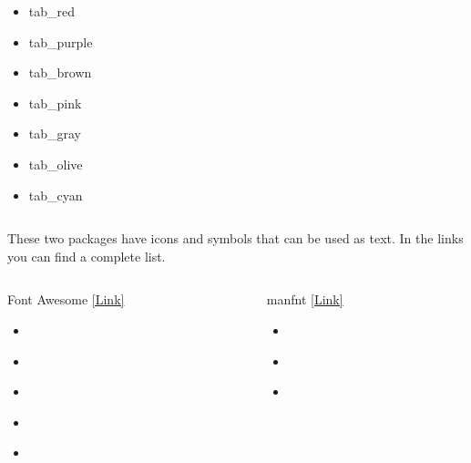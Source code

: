 \documentclass[aspectratio=1610,11pt]{beamer}
\begin{document}
\begin{frame}{\insertsection}
\begin{columns}[t]
\begin{column}{0.33\textwidth}
\begin{itemize}
            \item \textcolor{tab_red}{tab\_red}
            \item \textcolor{tab_purple}{tab\_purple}
            \item \textcolor{tab_brown}{tab\_brown}
            \item \textcolor{tab_pink}{tab\_pink}
            \item \textcolor{tab_gray}{tab\_gray}
            \item \textcolor{tab_olive}{tab\_olive}
            \item \textcolor{tab_cyan}{tab\_cyan}
            \end{itemize}
        \end{column}
    \end{columns}
\end{frame}





\begin{frame}{\insertsection}
These two packages have icons and symbols that can be used as text. In the links you can find a complete list.
\begin{columns}[t]
    \begin{column}{0.5\textwidth}
       Font Awesome \href{https://mirrors.ibiblio.org/CTAN/fonts/fontawesome/doc/fontawesome.pdf}{[Link]}
       \begin{itemize}
           \item \faHeart
           \item \textcolor{kthcolor}{\faThumbsOUp}
           \item \textcolor{kthcolor_green}{\faLeaf} \faLeaf
           \item \textcolor{kthcolor_pink}{\faBicycle}
           \item \faInstagram
       \end{itemize}
    \end{column}
    \begin{column}{0.5\textwidth}
       manfnt \href{https://ctan.org/pkg/manfnt}{[Link]}
       \begin{itemize}
           \item \manconcentriccircles
           \item \textcolor{matlabcolor3}{\manstar} \manstar
           \item \mancube
       \end{itemize}
    \end{column}
\end{columns}
\end{frame}
\end{document}
